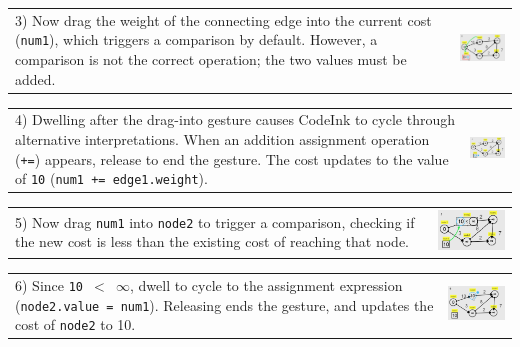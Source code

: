 \noindent \begin{tabular}{m{4.2cm} m{3.8cm}}
3) Now drag the weight of the connecting edge into the current cost
(\texttt{num1}), which triggers a comparison by default. However, a
comparison is not the correct operation; the two values
must be added.
& \includegraphics[width=3.8cm]{img/examples/dijkstra-3.png}
\end{tabular}

\noindent \begin{tabular}{m{4.2cm} m{3.8cm}}
4) Dwelling after the drag-into gesture causes CodeInk to cycle through alternative
interpretations. When an addition assignment
operation (\texttt{+=}) appears, release to end the gesture. The cost
updates to the value of \texttt{10} (\texttt{num1 += edge1.weight}).
& \includegraphics[width=3.8cm]{img/examples/dijkstra-4.png}
\end{tabular}

\noindent \begin{tabular}{m{4.2cm} m{3.8cm}}
5) Now drag \texttt{num1} into \texttt{node2}
to trigger a comparison, checking if the new cost is less than
the existing cost of reaching that node.
& \includegraphics[width=3.8cm]{img/examples/dijkstra-5.png}
\end{tabular}

\noindent \begin{tabular}{m{4.2cm} m{3.8cm}}
6) Since \texttt{10 $<$ $\infty$}, dwell to cycle to the assignment
expression (\texttt{node2.value = num1}). Releasing ends the gesture, and updates the cost
of \texttt{node2} to 10.
& \includegraphics[width=3.8cm]{img/examples/dijkstra-6.png}
\end{tabular}

